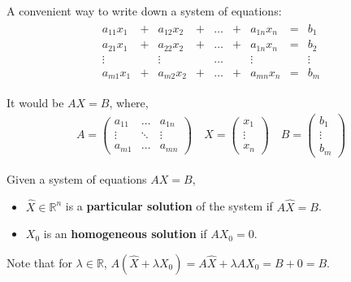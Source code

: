 \documentclass[aspectratio=169]{beamer}
\begin{document}
\begin{frame}
    A convenient way to write down a system of equations:
    \begin{align*}
        \begin{array}{ccccccccc}
        a_{11} x_1 &+& a_{12} x_2 &+&\ldots &+& a_{1n}x_n  &=& b_1\\
        a_{21} x_1 &+& a_{22} x_2 &+&\ldots &+& a_{1n}x_n  &=& b_2\\
        \vdots & &  \vdots & &\ldots & & \vdots  & & \vdots\\
        a_{m1} x_1 &+& a_{m2} x_2 &+&\ldots &+& a_{mn}x_n  &=& b_m
        \end{array}
    \end{align*}
    
    It would be $A X = B$, where,
    \begin{align*}
        A=\left(\begin{array}{ccc}a_{11}&\ldots&a_{1n}\\ \vdots & \ddots & \vdots \\ a_{m1}&\ldots&a_{mn}\end{array}\right)\quad X=\left(\begin{array}{c}x_1\\ \vdots \\ x_n\end{array}\right) \quad
        B = \left(\begin{array}{c}
             b_1\\\vdots \\ b_m
        \end{array}\right)
    \end{align*}
\end{frame}

\begin{frame}
\begin{definition}
    Given a system of equations $AX=B$, \begin{itemize}
        \item $\hat{X}\in\mathbb{R}^n$ is a \textbf{particular solution} of the system if $A\hat{X}=B$.
        \item $X_0$ is an \textbf{homogeneous solution} if $AX_0=0$.
    \end{itemize}
    
    
\end{definition}
    
    Note that for $\lambda\in\mathbb{R}$, $A(\hat{X}+\lambda X_0)=A\hat{X}+\lambda A X_0 = B+0 = B$.
    
    \vspace{0.5cm}
    
\end{frame}
\end{document}
